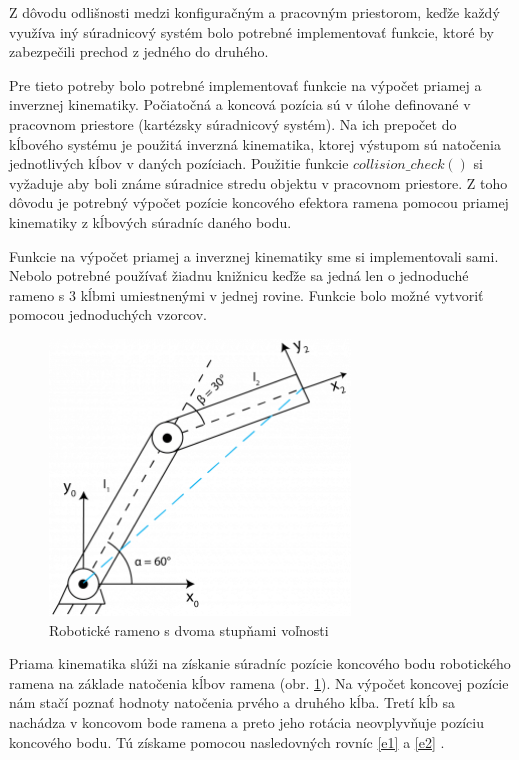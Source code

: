 Z dôvodu odlišnosti medzi konfiguračným a pracovným priestorom, keďže každý využíva iný súradnicový systém bolo potrebné implementovať funkcie, ktoré by zabezpečili prechod z jedného do druhého.   

Pre tieto potreby bolo potrebné implementovať funkcie na výpočet priamej a inverznej kinematiky.
Počiatočná a koncová pozícia sú v úlohe definované v pracovnom priestore (kartézsky súradnicový systém). Na ich prepočet do kĺbového systému je použitá inverzná kinematika, ktorej výstupom sú natočenia jednotlivých kĺbov v daných pozíciach. Použitie funkcie  $ collision\_check() $ si vyžaduje aby boli známe súradnice stredu objektu v pracovnom priestore. Z toho dôvodu je potrebný výpočet pozície koncového efektora ramena pomocou priamej kinematiky z kĺbových súradníc daného bodu.

Funkcie na výpočet priamej a inverznej kinematiky sme si implementovali sami. Nebolo potrebné používať žiadnu knižnicu keďže sa jedná len o jednoduché rameno s 3 kĺbmi umiestnenými v jednej rovine. Funkcie bolo možné vytvoriť pomocou jednoduchých vzorcov.

 \begin{figure}[h]
	\centering
	\includegraphics[width=80mm]{img/FK1.png}
	\caption{Robotické rameno s dvoma stupňami voľnosti \cite{FKIK}} \label{OBRAZOK 4.8} 
\end{figure} 

Priama kinematika slúži na získanie súradníc pozície koncového bodu robotického ramena na základe natočenia kĺbov ramena (obr. \ref{OBRAZOK 4.8}). Na výpočet koncovej pozície nám stačí poznať hodnoty natočenia prvého a druhého kĺba. Tretí kĺb sa nachádza v koncovom bode ramena a preto jeho rotácia neovplyvňuje pozíciu koncového bodu.
Tú získame pomocou nasledovných rovníc  \ref{e1}  a  \ref{e2}  \cite{FKIK}.

